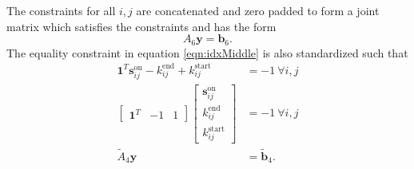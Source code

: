 The constraints for all $i,j$ are concatenated and zero padded to form a joint matrix which satisfies the constraints and has the form 
\begin{equation}
	A_6\mathbf{y} = \mathbf{b}_6.
\end{equation}
The equality constraint in equation \ref{eqn:idxMiddle} is also standardized such that
\begin{equation} \begin{aligned}
	\mathbf{1}^T\mathbf{s}_{ij}^{\text{on}} - k_{ij}^{\text{end}} + k_{ij}^{\text{start}} &= -1 \ \forall i,j\\
	\begin{bmatrix}\mathbf{1}^T & -1 & 1\end{bmatrix} \begin{bmatrix}\mathbf{s}_{ij}^{\text{on}} \\ k_{ij}^{\text{end}} \\ k_{ij}^{\text{start}} \end{bmatrix} &= -1 \ \forall i,j \\
		\tilde{A}_4\mathbf{y} &= \tilde{\mathbf{b}}_4.
\end{aligned} \end{equation}

